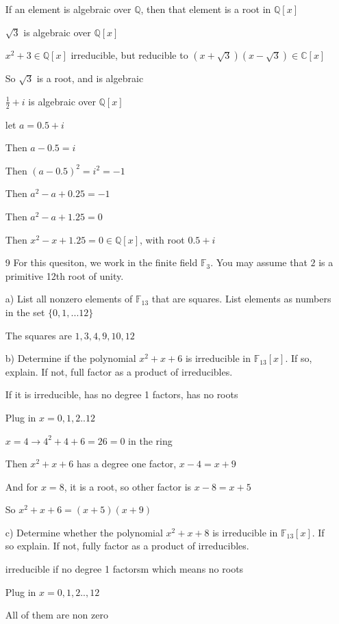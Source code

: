 \documentclass[12pt]{article}
\begin{document}
\begin{itemize}
		If an element is algebraic over $\mathbb{Q}$, then that element is a root in $\mathbb{Q}[x]$

		$\sqrt{3}$ is algebraic over $\mathbb{Q}[x]$

		$x^2 + 3 \in\mathbb{Q}[x]$ irreducible, but reducible to $(x + \sqrt{3})(x-\sqrt{3})\in\mathbb{C}[x]$

		So $\sqrt{3}$ is a root, and is algebraic

		$\frac{1}{2} + i$ is algebraic over $\mathbb{Q}[x]$

		let $a = 0.5 + i$

		Then $a - 0.5 = i$

		Then $(a - 0.5)^2 = i^2 = -1$

		Then $a^2 - a + 0.25 = -1$

		Then $a^2 - a + 1.25 = 0$

		Then $x^2 - x + 1.25 = 0 \in \mathbb{Q}[x]$, with root $0.5 + i$ 

	\item[9] For this quesiton, we work in the finite field $\mathbb{F}_{3}$. You may assume that $2$ is a primitive 12th root of unity.

		a) List all nonzero elements of $\mathbb{F}_{13}$ that are squares. List elements as numbers in the set $\{0,1,...12\}$

		The squares are	$1, 3, 4, 9, 10, 12$

		b) Determine if the polynomial $x^2 + x + 6$ is irreducible in $\mathbb{F}_{13}[x]$. If so, explain. If not, full factor as a product of irreducibles.

		If it is irreducible, has no degree 1 factors, has no roots

		Plug in $x = 0,1,2..12$

		$x =4 \rightarrow 4^2 + 4 + 6 = 26 = 0$ in the ring

		Then $x^2+x+6$ has a degree one factor, $x-4 = x+9$

		And for $x = 8$, it is a root, so other factor is $x-8 = x+5$

		So $x^2 + x + 6 = (x+5)(x+9)$

		c) Determine whether the polynomial $x^2 + x + 8$ is irreducible in $\mathbb{F}_{13}[x]$. If so explain. If not, fully factor as a product of irreducibles.

		irreducible if no degree 1 factorsm which means no roots

		Plug in $x = 0,1,2..,12$

		All of them are non zero


\end{itemize}
\end{document}
